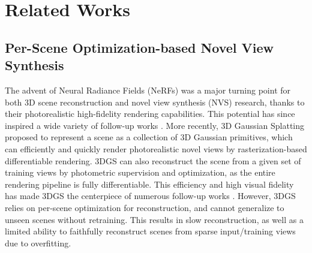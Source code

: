 \documentclass[runningheads]{llncs}
\begin{document}
\section{Related Works}
\label{sec:rel-works}
\subsection{Per-Scene Optimization-based Novel View Synthesis}
\label{sec:rel-works-per-scene-nvs}
The advent of Neural Radiance Fields (NeRFs) \cite{mildenhall2021nerf} was a major turning point for both 3D scene reconstruction and novel view synthesis (NVS) research, thanks to their photorealistic high-fidelity rendering capabilities.
This potential has since inspired a wide variety of follow-up works \cite{bui2025moblurf,cao2023hexplane,chen2022tensorf,fridovich2022plenoxels,fridovich2023k,garbin2021fastnerf,hu2022efficientnerf,muller2022instant,yu2021plenoctrees}.
More recently, 3D Gaussian Splatting \cite{kerbl20233d} proposed to represent a scene as a collection of 3D Gaussian primitives, which can efficiently and quickly render photorealistic novel views by rasterization-based differentiable rendering. 3DGS can also reconstruct the scene from a given set of training views by photometric supervision and optimization, as the entire rendering pipeline is fully differentiable. This efficiency and high visual fidelity has made 3DGS the centerpiece of numerous follow-up works \cite{guedon2024sugar,yang2024deformable,wu20244d,lu2024scaffold,fan2024lightgaussian,keetha2024splatam,yan2024gs}.
However, 3DGS relies on per-scene optimization for reconstruction, and cannot generalize to unseen scenes without retraining. This results in slow reconstruction, as well as a limited ability to faithfully reconstruct scenes from sparse input/training views due to overfitting.
\end{document}
